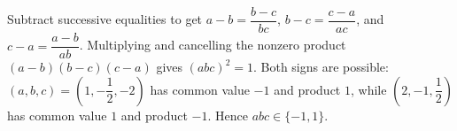 Subtract successive equalities to get $a-b=\dfrac{b-c}{bc}$, $b-c=\dfrac{c-a}{ac}$, and $c-a=\dfrac{a-b}{ab}$. Multiplying and cancelling the nonzero product $(a-b)(b-c)(c-a)$ gives $(abc)^2=1$. Both signs are possible: $(a,b,c)=(1,-\dfrac{1}{2},-2)$ has common value $-1$ and product $1$, while $(2,-1,\dfrac{1}{2})$ has common value $1$ and product $-1$. Hence $\boxed{abc\in\{-1,1\}}$.
